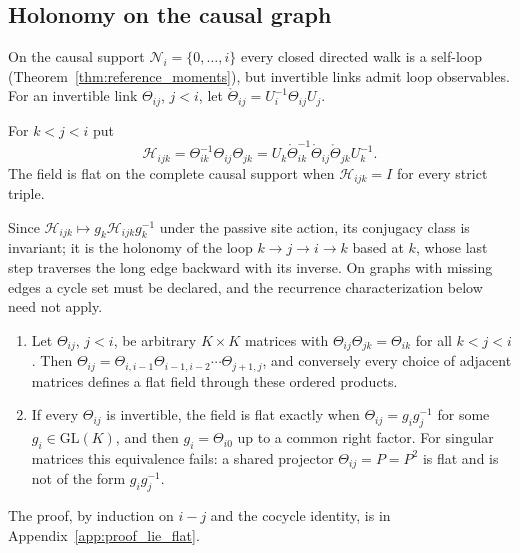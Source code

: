 \documentclass[twoside,11pt]{article}
\begin{document}
\subsection{Holonomy on the causal graph}
\label{sec:lie_holonomy}
\label{sec:flat_identification}

On the causal support $\mathcal N_i=\{0,\ldots,i\}$ every closed directed walk is a self-loop (Theorem~\ref{thm:reference_moments}), but invertible links admit loop observables. For an invertible link $\Theta_{ij}$, $j<i$, let $\mathring\Theta_{ij}=U_i^{-1}\Theta_{ij}U_j$.

\begin{definition}
\label{def:lie_triangle}
For $k<j<i$ put
\begin{equation}
\mathcal H_{ijk}=\Theta_{ik}^{-1}\Theta_{ij}\Theta_{jk}=U_k\mathring\Theta_{ik}^{-1}\mathring\Theta_{ij}\mathring\Theta_{jk}U_k^{-1}.
\label{eq:lie_triangle}
\end{equation}
The field is flat on the complete causal support when $\mathcal H_{ijk}=I$ for every strict triple.
\end{definition}

Since $\mathcal H_{ijk}\mapsto g_k\mathcal H_{ijk}g_k^{-1}$ under the passive site action, its conjugacy class is invariant; it is the holonomy of the loop $k\to j\to i\to k$ based at $k$, whose last step traverses the long edge backward with its inverse. On graphs with missing edges a cycle set must be declared, and the recurrence characterization below need not apply.

\begin{proposition}
\label{prop:lie_flat}
\begin{enumerate}
\item Let $\Theta_{ij}$, $j<i$, be arbitrary $K\times K$ matrices with $\Theta_{ij}\Theta_{jk}=\Theta_{ik}$ for all $k<j<i$. Then $\Theta_{ij}=\Theta_{i,i-1}\Theta_{i-1,i-2}\cdots\Theta_{j+1,j}$, and conversely every choice of adjacent matrices defines a flat field through these ordered products.
\item If every $\Theta_{ij}$ is invertible, the field is flat exactly when $\Theta_{ij}=g_ig_j^{-1}$ for some $g_i\in\mathrm{GL}(K)$, and then $g_i=\Theta_{i0}$ up to a common right factor. For singular matrices this equivalence fails: a shared projector $\Theta_{ij}=P=P^2$ is flat and is not of the form $g_ig_j^{-1}$.
\end{enumerate}
\end{proposition}
The proof, by induction on $i-j$ and the cocycle identity, is in Appendix~\ref{app:proof_lie_flat}.
\end{document}
